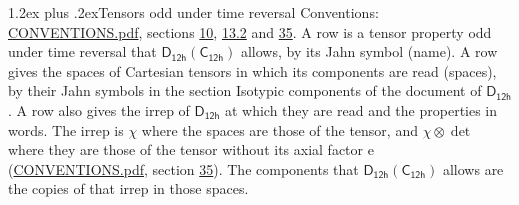 \documentclass[10pt,a4paper]{article}
\makeatletter
\renewcommand\section{\@startsection{section}{1}{\z@}{-3ex plus -1ex minus -.2ex}%
  {1.2ex plus .2ex}{\normalfont\large\sffamily\bfseries\color{parttitle}}}
\numberwithin{equation}{section}
\newcommand{\grp}[1]{\mathsf{#1}}
\newcommand{\irrprod}{\otimes}
\makeatother
\begin{document}
\section{Tensors odd under time reversal}\label{s:time_odd}
Conventions: \href{../../CONVENTIONS.pdf}{CONVENTIONS.pdf}, sections \href{../../../rotation/CONVENTIONS.pdf\#conv.10}{10}, \href{../../../rotation/CONVENTIONS.pdf\#conv.13.2}{13.2} and \href{../../CONVENTIONS.pdf\#conv.35}{35}.
\leavevmode\label{n:head.name.property}A row is a tensor property odd under time reversal that $\grp{D_{12h}}(\grp{C_{12h}})$ allows, by its Jahn symbol (name). \label{n:head.spaces}A row gives the spaces of Cartesian tensors in which its components are read (spaces), by their Jahn symbols in the section Isotypic components of the document of \href{../../../rotation/data/pdf/D12h.pdf}{$\grp{D_{12h}}$}. \label{n:head.properties}A row also gives the irrep of $\grp{D_{12h}}$ at which they are read and the properties in words. The irrep is $\chi$ where the spaces are those of the tensor, and $\chi \irrprod \det$ where they are those of the tensor without its axial factor e (\href{../../CONVENTIONS.pdf}{CONVENTIONS.pdf}, section \href{../../CONVENTIONS.pdf\#conv.35}{35}). The components that $\grp{D_{12h}}(\grp{C_{12h}})$ allows are the copies of that irrep in those spaces.
\end{document}
